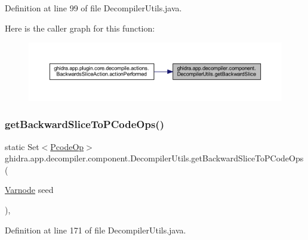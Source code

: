 Definition at line 99 of file Decompiler\+Utils.\+java.

Here is the caller graph for this function\+:
\nopagebreak
\begin{figure}[H]
\begin{center}
\leavevmode
\includegraphics[width=350pt]{classghidra_1_1app_1_1decompiler_1_1component_1_1_decompiler_utils_a1307674bdd9f48bfb0919950d59be19b_icgraph}
\end{center}
\end{figure}
\mbox{\label{classghidra_1_1app_1_1decompiler_1_1component_1_1_decompiler_utils_a0ab1ddf9b7ca7bf0e66ef9b367c6a17f}} 
\subsubsection{\texorpdfstring{getBackwardSliceToPCodeOps()}{getBackwardSliceToPCodeOps()}}
{\footnotesize\ttfamily static Set$<$\mbox{\hyperlink{class_pcode_op}{Pcode\+Op}}$>$ ghidra.\+app.\+decompiler.\+component.\+Decompiler\+Utils.\+get\+Backward\+Slice\+To\+P\+Code\+Ops (\begin{DoxyParamCaption}\item[{\mbox{\hyperlink{class_varnode}{Varnode}}}]{seed }\end{DoxyParamCaption})\hspace{0.3cm}{\ttfamily [inline]}, {\ttfamily [static]}}



Definition at line 171 of file Decompiler\+Utils.\+java.

